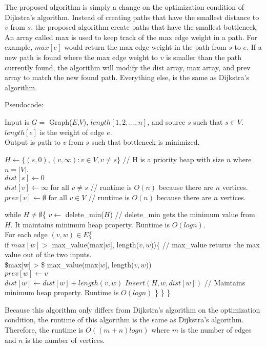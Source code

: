 \documentclass[11pt]{article}
\begin{document}
    The proposed algorithm is simply a change on the optimization condition
of Dijkstra's algorithm. Instead of creating paths that have the
smallest distance to \(v\) from \(s\), the proposed algorithm create
paths that have the smallest bottleneck. An array called max is used to
keep track of the max edge weight in a path. For example, \(max[e]\)
would return the max edge weight in the path from \(s\) to \(e\). If a
new path is found where the max edge weight to \(v\) is smaller than the
path currently found, the algorithm will modify the dist array, max
array, and prev array to match the new found path. Everything else, is
the same as Dijkstra's algorithm.

Pseudocode:

Input is \(G=\) Graph(\(E\),\(V\)), \(length[1, 2, ..., n]\), and source
\(s\) such that \(s \in V\). \(length[e]\) is the weight of edge
\(e\).\\
Output is path to \(v\) from \(s\) such that bottleneck is minimized.

\(H \leftarrow \{(s,0), (v, \infty) : v \in V, v \neq s\}\) // H is a
priority heap with size \(n\) where \(n=|V|\).\\
\(dist[s] \leftarrow 0\)\\
\(dist[v] \leftarrow \infty\) for all \(v \neq s\) // runtime is
\(O(n)\) because there are \(n\) vertices.\\
\(prev[v] \leftarrow \emptyset\) for all \(v \in V\) // runtime is
\(O(n)\) because there are \(n\) vertices.

while \(H \neq \emptyset\)\{ \(v \leftarrow\) delete\_min(\(H\)) //
delete\_min gets the minimum value from \(H\). It maintains minimum heap
property. Runtime is \(O(logn)\).\\
For each edge \((v,w) \in E\)\{\\
if \(max[w] >\) max\_value(max{[}\(w\){]}, length(\(v,w\)))\{ //
max\_value returns the max value out of the two inputs.\\
\$max{[}w{]} \textgreater{} \$ max\_value(max{[}\(w\){]},
length(\(v,w\)))\\
\(prev[w] \leftarrow v\)\\
\(dist[w] \leftarrow dist[w] + length(v,w)\) \(Insert(H, w, dist[w])\)
// Maintains minimum heap property. Runtime is \(O(logn)\) \} \} \}

    Because this algorithm only differs from Dijkstra's algorithm on the
optimization condition, the runtime of this algorithm is the same as
Dijkstra's algorithm. Therefore, the runtime is \(O((m+n)logn)\) where
\(m\) is the number of edges and \(n\) is the number of vertices.
\end{document}
